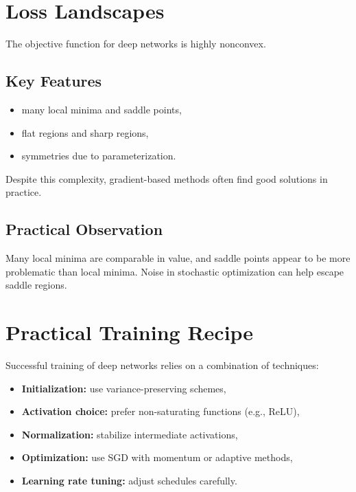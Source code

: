 \section{Loss Landscapes}

The objective function for deep networks is highly nonconvex.

\subsection{Key Features}

\begin{itemize}
    \item many local minima and saddle points,
    \item flat regions and sharp regions,
    \item symmetries due to parameterization.
\end{itemize}

Despite this complexity, gradient-based methods often find good solutions in practice.

\subsection{Practical Observation}

Many local minima are comparable in value, and saddle points appear to be more problematic than local minima. Noise in stochastic optimization can help escape saddle regions.

\section{Practical Training Recipe}

Successful training of deep networks relies on a combination of techniques:

\begin{itemize}
    \item \textbf{Initialization:} use variance-preserving schemes,
    \item \textbf{Activation choice:} prefer non-saturating functions (e.g., ReLU),
    \item \textbf{Normalization:} stabilize intermediate activations,
    \item \textbf{Optimization:} use SGD with momentum or adaptive methods,
    \item \textbf{Learning rate tuning:} adjust schedules carefully.
\end{itemize}

